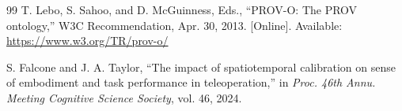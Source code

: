 \documentclass[letterpaper,10pt,conference]{ieeeconf}
\begin{document}
\begin{thebibliography}{99}
T. Lebo, S. Sahoo, and D. McGuinness, Eds., ``PROV-O: The PROV ontology,'' W3C Recommendation, Apr. 30, 2013. [Online]. Available: \url{https://www.w3.org/TR/prov-o/}

S. Falcone and J. A. Taylor, ``The impact of spatiotemporal calibration on sense of embodiment and task performance in teleoperation,'' in \emph{Proc. 46th Annu. Meeting Cognitive Science Society}, vol. 46, 2024.

\end{thebibliography}
\end{document}
